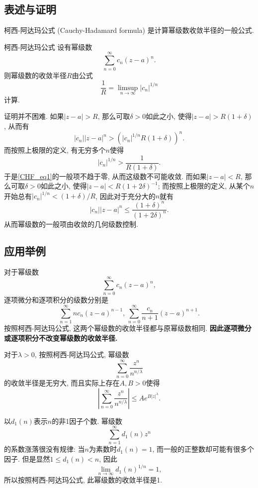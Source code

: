 
\subsection{表述与证明}

柯西-阿达玛公式 (Cauchy-Hadamard formula) 是计算幂级数收敛半径的一般公式.

\begin{theorem}{柯西-阿达玛公式}
设有幂级数
\begin{equation}\label{CHF_eq1}
\sum_{n=0}^\infty c_n(z-a)^n.
\end{equation}
则幂级数的收敛半径$R$由公式
$$
\frac{1}{R}=\limsup_{n\to\infty}|c_n|^{1/n}
$$
计算.
\end{theorem}
证明并不困难. 如果$|z-a|>R$, 那么可取$\delta>0$如此之小, 使得$|z-a|>R(1+\delta)$, 从而有
$$
|c_n||z-a|^n>(|c_n|^{1/n}R(1+\delta))^n.
$$
而按照上极限的定义, 有无穷多个$n$使得
$$
|c_n|^{1/n}>\frac{1}{R(1+\delta)}.
$$
于是\autoref{CHF_eq1}的一般项不趋于零, 从而这级数不可能收敛. 而如果$|z-a|<R$, 那么可取$\delta>0$如此之小, 使得$|z-a|<R(1+2\delta)^{-1}$; 而按照上极限的定义, 从某个$n$开始总有$|c_n|^{1/n}<(1+\delta)/R$, 因此对于充分大的$n$就有
$$
|c_n||z-a|^n\leq\frac{(1+\delta)^n}{(1+2\delta)^n}.
$$
从而幂级数的一般项由收敛的几何级数控制.

\subsection{应用举例}
对于幂级数
$$
\sum_{n=0}^\infty c_n(z-a)^n,
$$
逐项微分和逐项积分的级数分别是
$$
\sum_{n=1}^\infty nc_n(z-a)^{n-1},\,
\sum_{n=0}^\infty \frac{c_n}{n+1}(z-a)^{n+1}.
$$
按照柯西-阿达玛公式, 这两个幂级数的收敛半径都与原幂级数相同. \textbf{因此逐项微分或逐项积分不改变幂级数的收敛半径.}

对于$\lambda>0$, 按照柯西-阿达玛公式, 幂级数
$$
\sum_{n=0}^\infty\frac{z^n}{n^{n/\lambda}}
$$
的收敛半径是无穷大, 而且实际上存在$A,B>0$使得
$$
\left|\sum_{n=0}^\infty\frac{z^n}{n^{n/\lambda}}\right|
\leq Ae^{B|z|^\lambda}.
$$

以$d_1(n)$表示$n$的非1因子个数. 幂级数
$$
\sum_{n=1}^\infty d_1(n)z^n
$$
的系数涨落很没有规律: 当$n$为素数时$d_1(n)=1$, 而一般的正整数却可能有很多个因子. 但是显然$1\leq d_1(n)<n$, 因此
$$
\lim_{n\to\infty}d_1(n)^{1/n}=1,
$$
所以按照柯西-阿达玛公式, 此幂级数的收敛半径是1.